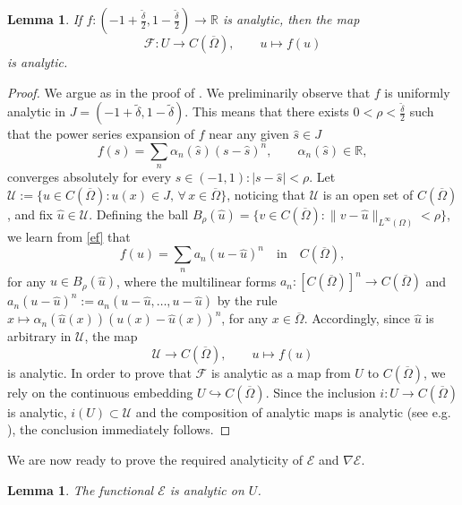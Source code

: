 \documentclass[11pt,reqno]{amsart}
\newtheorem{lemma}[theorem]{Lemma}
\theoremstyle{remark}
\def\R{\mathbb{R}}
\def\E{\mathcal{E}}
\numberwithin{equation}{section}
\begin{document}
\begin{lemma}
\label{ana-psi}
If $f:(-1+ \frac{\widetilde{\delta}}{2},1-\frac{\widetilde{\delta}}{2})\to\R$ is analytic, then the map
$$\mathcal{F}:U\to  C(\overline{\Omega}),\qquad u\mapsto f(u)$$ is analytic.
\end{lemma}
\begin{proof}
We argue as in the proof of \cite[Corollary 4.6]{CHILL}. We preliminarily observe that $f$ is uniformly analytic in $J=(-1+\widetilde{\delta},1-\widetilde{\delta})$. This means that there exists $0< \rho<\frac{\widetilde{\delta}}{2}$ such that the power series expansion of $f$ near any given $\widehat{s}\in J$
\begin{equation}
\label{ef}
f(s)=\sum_n \alpha_n(\widehat{s})(s-\widehat{s})^n,\qquad \alpha_n(\widehat{s})\in \R,
\end{equation}
converges absolutely for every $s\in (-1,1):|s-\widehat{s}|<\rho$.
Let $\mathcal{U}:=\{u\in C(\overline{\Omega}): u(x)\in J,\,\forall \, x\in\overline{\Omega}\}$,
noticing that $\mathcal U$ is an open set of $C(\overline{\Omega})$, and
fix $\widehat{u}\in\mathcal{U}$. Defining the ball $B_\rho(\widehat{u})=\{v\in C(\overline{\Omega}):\|v-\widehat{u}\|_{L^\infty(\Omega)}<\rho\}$, we learn from \eqref{ef} that
$$
f(u)=\sum_n a_n(u-\widehat{u})^n\quad\text{in}\quad C(\overline{\Omega}),
$$
for any $u\in B_\rho(\widehat{u})$, where the multilinear forms $a_n:[C(\overline{\Omega})]^n\to C(\overline{\Omega})$ and $a_n(u-\widehat{u})^n:=a_n(u-\widehat{u},\dots,u-\widehat{u})$  by the rule $x\mapsto \alpha_n(\widehat{u}(x))(u(x)-\widehat{u}(x))^n$, for any $x\in \overline{\Omega}$.
Accordingly, since $\widehat{u}$ is arbitrary in $\mathcal{U}$, the map
$$
 \mathcal{U}\to C(\overline{\Omega}), \qquad  u\mapsto f(u)
 $$ is analytic.
In order to prove that $\mathcal{F}$ is analytic as a map from $U$ to $C(\overline{\Omega})$, we rely on the continuous embedding $U\hookrightarrow C(\overline{\Omega})$. Since the inclusion $i:U \to C(\overline{\Omega})$ is analytic, $i(U)\subset \mathcal{U}$ and the composition of analytic maps is analytic (see e.g. \cite[Theorem 2.2]{RUPP}), the conclusion immediately follows.
\end{proof}

We are now ready to prove the required analyticity of $\E$ and $\nabla \E$.

\begin{lemma}
\label{E-analytic}
The functional $\E$ is analytic on $U$.
\end{lemma}
\end{document}
